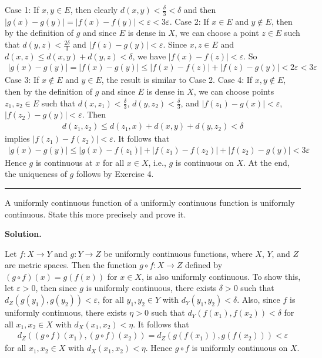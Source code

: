 \documentclass[12pt]{article}
\theoremstyle{definition}
\begin{document}
Case 1: If $x,y\in E$, then clearly $d(x,y)<\frac{\delta}{3}<\delta$ and then $\left\vert g(x)-g(y)\right\vert=\left\vert f(x)-f(y)\right\vert<\varepsilon<3\varepsilon$.
Case 2: If $x\in E$ and $y\notin E$, then by the definition of $g$ and since $E$ is dense in $X$, we can choose a point $z\in E$ such that $d(y,z)<\frac{2\delta}{3}$ and $\left\vert f(z)-g(y)\right\vert<\varepsilon$. Since $x,z\in E$ and $d(x,z)\le d(x,y)+d(y,z)<\delta$, we have $\left\vert f(x)-f(z)\right\vert<\varepsilon$. So
\begin{align*}
\left\vert g(x)-g(y)\right\vert
=\left\vert f(x)-g(y)\right\vert
\le\left\vert f(x)-f(z)\right\vert+\left\vert f(z)-g(y)\right\vert
<2\varepsilon
<3\varepsilon
\end{align*}
Case 3: If $x\notin E$ and $y\in E$, the result is similar to Case 2.
Case 4: If $x,y\notin E$, then by the definition of $g$ and since $E$ is dense in $X$, we can choose points $z_1,z_2\in E$ such that $d(x,z_1)<\frac{\delta}{3}$, $d(y,z_2)<\frac{\delta}{3}$, and $\left\vert f(z_1)-g(x)\right\vert<\varepsilon$, $\left\vert f(z_2)-g(y)\right\vert<\varepsilon$. Then
\begin{align*}
d(z_1,z_2)
\le d(z_1,x)+d(x,y)+d(y,z_2)
<\delta
\end{align*}
implies $\left\vert f(z_1)-f(z_2)\right\vert<\varepsilon$. It follows that
\begin{align*}
\left\vert g(x)-g(y)\right\vert
\le \left\vert g(x)-f(z_1)\right\vert+\left\vert f(z_1)-f(z_2)\right\vert+\left\vert f(z_2)-g(y)\right\vert
<3\varepsilon
\end{align*}
Hence $g$ is continuous at $x$ for all $x\in X$, i.e., $g$ is continuous on $X$. At the end, the uniqueness of $g$ follows by Exercise 4.



\bigskip\noindent\hrule\bigskip

A uniformly continuous function of a uniformly continuous function is uniformly continuous.
State this more precisely and prove it.

\smallskip
\noindent\textbf{Solution.}\quad

Let $f:X\to Y$ and $g:Y\to Z$ be uniformly continuous functions, where $X$, $Y$, and $Z$ are metric spaces. Then the function $g\circ f:X\to Z$ defined by $(g\circ f)(x)=g(f(x))$ for $x\in X$, is also uniformly continuous. To show this, let $\varepsilon>0$, then since $g$ is uniformly continuous, there exists $\delta>0$ such that $d_Z(g(y_1),g(y_2))<\varepsilon$, for all $y_1,y_2\in Y$ with $d_Y(y_1,y_2)<\delta$. Also, since $f$ is uniformly continuous, there exists $\eta>0$ such that $d_Y(f(x_1),f(x_2))<\delta$ for all $x_1,x_2\in X$ with $d_X(x_1,x_2)<\eta$. It follows that
\begin{align*}
d_Z((g\circ f)(x_1),(g\circ f)(x_2))
=d_Z(g(f(x_1)),g(f(x_2)))
<\varepsilon
\end{align*}
for all $x_1,x_2\in X$ with $d_X(x_1,x_2)<\eta$. Hence $g\circ f$ is uniformly continuous on $X$.
\end{document}
